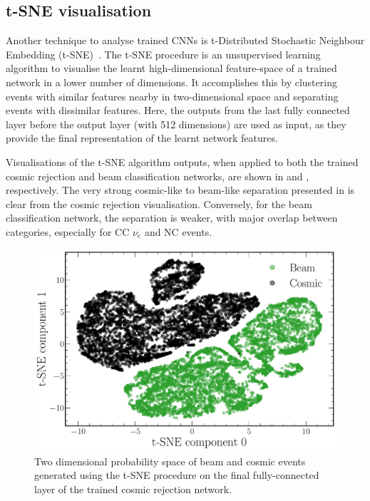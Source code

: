 \subsection{t-SNE visualisation} %
\label{sec:results_explain_tsne} %

Another technique to analyse trained CNNs is t-Distributed Stochastic Neighbour Embedding
(t-SNE)~\cite{maaten2008}. The t-SNE procedure is an unsupervised learning algorithm to visualise
the learnt high-dimensional feature-space of a trained network in a lower number of dimensions. It
accomplishes this by clustering events with similar features nearby in two-dimensional space and
separating events with dissimilar features. Here, the outputs from the last fully connected layer
before the output layer (with 512 dimensions) are used as input, as they provide the final
representation of the learnt network features.

Visualisations of the t-SNE algorithm outputs, when applied to both the trained cosmic rejection
and beam classification networks, are shown in  and
, respectively. The very strong cosmic-like to beam-like
separation presented in  is clear from the cosmic rejection
visualisation. Conversely, for the beam classification network, the separation is weaker, with
major overlap between categories, especially for CC $\nu_{e}$ and NC events.

\begin{figure} %
    \includegraphics[width=\textwidth]{diagrams/7-results/explain_cosmic_tsne.pdf}
    \caption[Cosmic rejection network output t-SNE space]
    {Two dimensional probability space of beam and cosmic events generated using the t-SNE
        procedure on the final fully-connected layer of the trained cosmic rejection network.}
    \label{fig:explain_cosmic_tsne}
\end{figure}

